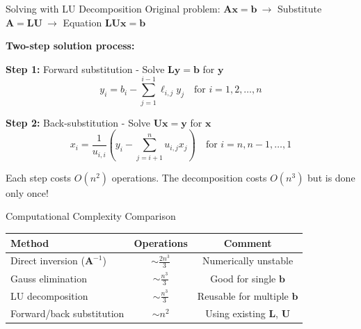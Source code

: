 \documentclass[aspectratio=169]{beamer}
\begin{document}
\begin{frame}{Solving with LU Decomposition}
	Original problem: $\mathbf{A}\mathbf{x} = \mathbf{b} \ \rightarrow$ Substitute $\mathbf{A} = \mathbf{L}\mathbf{U} \ \rightarrow$ Equation $\mathbf{L}\mathbf{U}\mathbf{x} = \mathbf{b}$

	\vspace{0.2cm}
	\textbf{Two-step solution process:}

	\textbf{Step 1:} \alert{Forward substitution} - Solve $\mathbf{L}\mathbf{y} = \mathbf{b}$ for $\mathbf{y}$
	\begin{equation*}
		y_i = b_i - \sum_{j=1}^{i-1} \ell_{i,j} y_j \quad \text{for } i = 1, 2, \ldots, n
	\end{equation*}

	\textbf{Step 2:} \alert{Back-substitution} - Solve $\mathbf{U}\mathbf{x} = \mathbf{y}$ for $\mathbf{x}$
	\begin{equation*}
		x_i = \frac{1}{u_{i,i}} \left( y_i - \sum_{j=i+1}^{n} u_{i,j} x_j \right) \quad \text{for } i = n, n-1, \ldots, 1
	\end{equation*}

	\vspace{0.3cm}
	\small{Each step costs $O(n^2)$ operations. The decomposition costs $O(n^3)$ but is done only once!}
\end{frame}

\begin{frame}{Computational Complexity Comparison}
	\begin{center}
		\renewcommand{\arraystretch}{1.2}
		\begin{tabular}{lcc}
			\hline
			\textbf{Method}                      & \textbf{Operations}   & \textbf{Comment}                           \\
			\hline
			Direct inversion ($\mathbf{A}^{-1}$) & $\sim \frac{2n^3}{3}$ & Numerically unstable                       \\[0.2cm]
			Gauss elimination                    & $\sim \frac{n^3}{3}$  & Good for single $\mathbf{b}$               \\[0.2cm]
			LU decomposition                     & $\sim \frac{n^3}{3}$  & \alert{Reusable for multiple $\mathbf{b}$} \\[0.2cm]
			Forward/back substitution            & $\sim n^2$            & Using existing $\mathbf{L}$, $\mathbf{U}$  \\[0.2cm]
			\hline
		\end{tabular}
	\end{center}
\end{frame}
\end{document}

